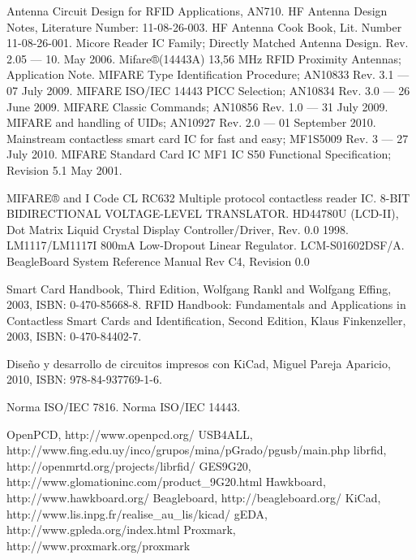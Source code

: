 \begin{thebibliography}{200}

 Antenna Circuit Design for RFID Applications, AN710.
 HF Antenna Design Notes, Literature Number: 11-08-26-003.
 HF Antenna Cook Book, Lit. Number 11-08-26-001.
 Micore Reader IC Family; Directly Matched Antenna Design. Rev. 2.05 — 10. May 2006.
 Mifare®(14443A) 13,56 MHz RFID Proximity Antennas; Application Note.
\bibitem{} MIFARE Type Identification Procedure; AN10833 Rev. 3.1 — 07 July 2009.
\bibitem{} MIFARE ISO/IEC 14443 PICC Selection; AN10834 Rev. 3.0 — 26 June 2009.
\bibitem{} MIFARE Classic Commands; AN10856 Rev. 1.0 — 31 July 2009.
\bibitem{} MIFARE and handling of UIDs; AN10927 Rev. 2.0 — 01 September 2010.
\bibitem{} Mainstream contactless smart card IC for fast and easy; MF1S5009 Rev. 3 — 27 July 2010.
\bibitem{} MIFARE Standard Card IC MF1 IC S50 Functional Specification; Revision 5.1 May 2001.

 MIFARE® and I Code CL RC632 Multiple protocol contactless reader IC.
 8-BIT BIDIRECTIONAL VOLTAGE-LEVEL TRANSLATOR.
 HD44780U (LCD-II), Dot Matrix Liquid Crystal Display Controller/Driver, Rev. 0.0 1998. 
 LM1117/LM1117I 800mA Low-Dropout Linear Regulator.
 LCM-S01602DSF/A.
 BeagleBoard System Reference Manual Rev C4, Revision 0.0

 Smart Card Handbook, Third Edition, Wolfgang Rankl and Wolfgang Effing, 2003, ISBN: 0-470-85668-8. 
 RFID Handbook: Fundamentals and Applications in Contactless Smart Cards and Identification,
Second Edition, Klaus Finkenzeller, 2003, ISBN: 0-470-84402-7. 

 Diseño y desarrollo de circuitos impresos con KiCad, Miguel Pareja Aparicio, 2010, ISBN: 978-84-937769-1-6.


 Norma ISO/IEC 7816.
 Norma ISO/IEC 14443.



 OpenPCD, http://www.openpcd.org/
 USB4ALL, http://www.fing.edu.uy/inco/grupos/mina/pGrado/pgusb/main.php
 librfid, http://openmrtd.org/projects/librfid/
 GES9G20, http://www.glomationinc.com/product\_9G20.html
 Hawkboard, http://www.hawkboard.org/
 Beagleboard, http://beagleboard.org/
 KiCad, http://www.lis.inpg.fr/realise\_au\_lis/kicad/
 gEDA, http://www.gpleda.org/index.html
 Proxmark, http://www.proxmark.org/proxmark


\end{thebibliography}
